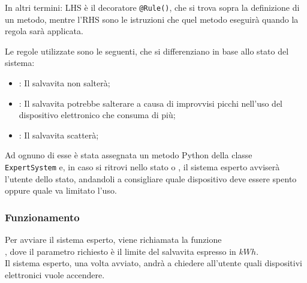 \documentclass[12pt, letterpaper]{article}
\begin{document}
\noindent In altri termini: LHS è il decoratore \texttt{@Rule()}, che si trova
sopra la definizione di un metodo, mentre l'RHS sono le istruzioni che quel metodo
eseguirà quando la regola sarà applicata.

\noindent Le regole utilizzate sono le seguenti, che si differenziano in base allo stato
del sistema:

\begin{itemize}
      \item {}: Il salvavita non salterà;
      \item {}: Il salvavita potrebbe salterare a causa di improvvisi
            picchi nell'uso del dispositivo elettronico che consuma di più;
      \item {}: Il salvavita scatterà;
\end{itemize}

\noindent Ad ognuno di esse è stata assegnata un metodo Python della classe \\
\texttt{ExpertSystem} e, in caso si ritrovi nello stato  o , il sistema esperto avviserà l'utente
dello stato, andandoli a consigliare quale dispositivo deve essere spento oppure quale va limitato l'uso.

\subsubsection{Funzionamento}

\noindent Per avviare il sistema esperto, viene richiamata la funzione \\
, dove il parametro richiesto è il
limite del salvavita espresso in $kWh$. \\

\noindent Il sistema esperto, una volta avviato, andrà a chiedere all'utente quali
dispositivi elettronici vuole accendere.
\end{document}
